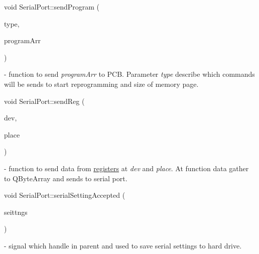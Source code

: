 \mbox{\label{classSerialPort_adc2e6d59b77389c9047aab5bb1ebd5dc}} 
{\footnotesize\ttfamily void Serial\+Port\+::\texorpdfstring{send\+Program}{sendProgram} (\begin{DoxyParamCaption}\item[{\mbox{\hyperlink{classReprogramDialog_a95e0c039a5de1ea8d3ad44a6ccf17b6a}{Reprogram\+Dialog\+::\+Board\+Type}}}]{type,  }\item[{Q\+Byte\+Array}]{program\+Arr }\end{DoxyParamCaption})\hspace{0.3cm}{\ttfamily [slot]}} - function to send \textit{program\+Arr} to PCB. Parameter \textit{type} describe which commands will be sends to start reprogramming and size of memory page.

\mbox{\label{classSerialPort_afe266bc6e1641be604b5d97c88910bc4}} 
{\footnotesize\ttfamily void Serial\+Port\+::\texorpdfstring{send\+Reg}{sendReg} (\begin{DoxyParamCaption}\item[{\mbox{\hyperlink{settings_8h_a48091a1e52849b0871df2f7081be2e38}{uint8\+\_\+t}}}]{dev,  }\item[{\mbox{\hyperlink{settings_8h_a48091a1e52849b0871df2f7081be2e38}{uint8\+\_\+t}}}]{place }\end{DoxyParamCaption})\hspace{0.3cm}{\ttfamily [slot]}} - function to send data from \hyperlink{classSerialPort_ab98c7d39235d59c2086d9f6e94c3ed4b}{registers} at \textit{dev} and \textit{place}. At function data gather to Q\+Byte\+Array and sends to serial port.

\mbox{\label{classSerialPort_a30f185f507d89b40a0204b6472da3217}} 
{\footnotesize\ttfamily void Serial\+Port\+::\texorpdfstring{serial\+Setting\+Accepted}{serialSettingAccepted} (\begin{DoxyParamCaption}\item[{\mbox{\hyperlink{structComSettings}{Com\+Settings}}}]{seittngs }\end{DoxyParamCaption})\hspace{0.3cm}{\ttfamily [signal]}} - signal which handle in parent and used to save serial settings to hard drive.


